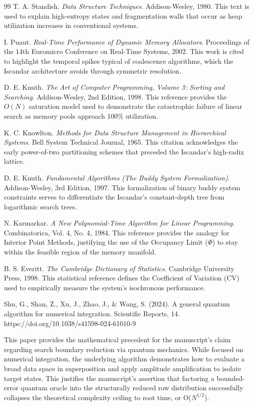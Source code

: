 \documentclass[11pt]{article}
\begin{document}
\begin{thebibliography}{99}
 T. A. Standish. \textit{Data Structure Techniques}. Addison-Wesley, 1980. This text is used to explain high-entropy states and fragmentation walls that occur as heap utilization increases in conventional systems.

 I. Puaut. \textit{Real-Time Performance of Dynamic Memory Allocators}. Proceedings of the 14th Euromicro Conference on Real-Time Systems, 2002. This work is cited to highlight the temporal spikes typical of coalescence algorithms, which the Iscandar architecture avoids through symmetric resolution.

 D. E. Knuth. \textit{The Art of Computer Programming, Volume 3: Sorting and Searching}. Addison-Wesley, 2nd Edition, 1998. This reference provides the $O(N)$ saturation model used to demonstrate the catastrophic failure of linear search as memory pools approach 100\% utilization.

 K. C. Knowlton. \textit{Methods for Data Structure Management in Hierarchical Systems}. Bell System Technical Journal, 1965. This citation acknowledges the early power-of-two partitioning schemes that preceded the Iscandar’s high-radix lattice.

 D. E. Knuth. \textit{Fundamental Algorithms (The Buddy System Formalization)}. Addison-Wesley, 3rd Edition, 1997. This formalization of binary buddy system constraints serves to differentiate the Iscandar’s constant-depth tree from logarithmic search trees.

 N. Karmarkar. \textit{A New Polynomial-Time Algorithm for Linear Programming}. Combinatorica, Vol. 4, No. 4, 1984. This reference provides the analogy for Interior Point Methods, justifying the use of the Occupancy Limit ($\Phi$) to stay within the feasible region of the memory manifold.

 B. S. Everitt. \textit{The Cambridge Dictionary of Statistics}. Cambridge University Press, 1998. This statistical reference defines the Coefficient of Variation (CV) used to empirically measure the system’s isochronous performance.

 Shu, G., Shan, Z., Xu, J., Zhao, J., & Wang, S. (2024). A general quantum algorithm for numerical integration. Scientific Reports, 14. https://doi.org/10.1038/s41598-024-61010-9

    This paper provides the mathematical precedent for the manuscript’s claim regarding search boundary reduction via quantum mechanics. While focused on numerical integration, the underlying algorithm demonstrates how to evaluate a broad data space in superposition and apply amplitude amplification to isolate target states. This justifies the manuscript's assertion that factoring a bounded-error quantum oracle into the structurally reduced row distribution successfully collapses the theoretical complexity ceiling to root time, or O($N^{1/2}$).


\end{thebibliography}
\end{document}
